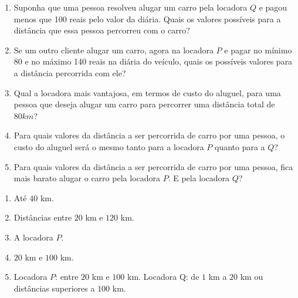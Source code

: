\documentclass[10 pt,usenames,dvipsnames, oneside]{article}
\begin{document}
\begin{enumerate}

\item{}
Suponha que uma pessoa resolveu alugar um carro pela locadora $Q$ e pagou menos que 100 reais pelo valor da diária. Quais os valores possíveis para a distância que essa pessoa percorreu com o carro?

\item{}
Se um outro cliente alugar um carro, agora na locadora $P$ e pagar no mínimo 80 e no máximo 140 reais na diária do veículo, quais os possíveis valores para a distância percorrida com ele?

\item{}
Qual a locadora mais vantajosa, em termos de custo do aluguel, para uma pessoa que deseja alugar um carro para percorrer uma distância total de $80 km$?

\item{} Para quais valores da distância a ser percorrida de carro por uma pessoa, o custo do aluguel será o mesmo tanto para a locadora $P$ quanto para a $Q$?

\item{} Para quais valores da distância a ser percorrida de carro por uma pessoa, fica mais barato alugar o carro pela locadora $P$. E pela locadora $Q$? 

\end{enumerate}

\ifdefined\prof
\begin{solucao}

\begin{enumerate}
\item Até $40$ km.
\item Distâncias entre $20$ km e $120$ km.
\item A locadora $P$.
\item  $20$ km e $100$ km. 
\item Locadora $P$: entre $20$ km e $100$ km.
Locadora Q: de $1$ km a $20$ km ou distâncias superiores a $100$ km.
\end{enumerate}

\end{solucao}
\fi
\end{document}
